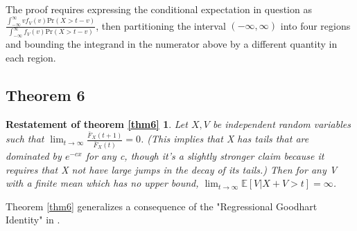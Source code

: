 \documentclass{article}
\begin{document}
The proof requires expressing the conditional expectation in question as $\frac{\int_{-\infty}^\infty vf_V(v)\text{Pr}(X>t-v)} {\int_{-\infty}^\infty f_V(v)\text{Pr}(X>t-v)}$, then partitioning the interval $(-\infty, \infty)$ into four regions and bounding the integrand in the numerator above by a different quantity in each region. 



\subsection{Theorem 6}
\newtheorem*{theorem6}{Restatement of theorem \ref{thm6}}
\begin{theorem6}
    Let $X, V$ be independent random variables such that $\lim_{t\to\infty}\frac{\bar{F}_X(t+1)}{\bar{F}_X(t)}=0$. (This implies that X has tails that are dominated by $e^{-cx}$ for any c, though it's a slightly stronger claim because it requires that X not have large jumps in the decay of its tails.)
    Then for any V with a finite mean which has no upper bound, $\lim_{t\to\infty}\mathbb{E}[V|X+V > t] = \infty$. 
\end{theorem6}

Theorem \ref{thm6} generalizes a consequence of the "Regressional Goodhart Identity" in \citep{gao2023scaling}.
\end{document}

